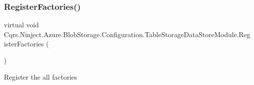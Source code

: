 \subsubsection{\texorpdfstring{Register\+Factories()}{RegisterFactories()}}
{\footnotesize\ttfamily virtual void Cqrs.\+Ninject.\+Azure.\+Blob\+Storage.\+Configuration.\+Table\+Storage\+Data\+Store\+Module.\+Register\+Factories (\begin{DoxyParamCaption}{ }\end{DoxyParamCaption})\hspace{0.3cm}{\ttfamily [virtual]}}



Register the all factories 

